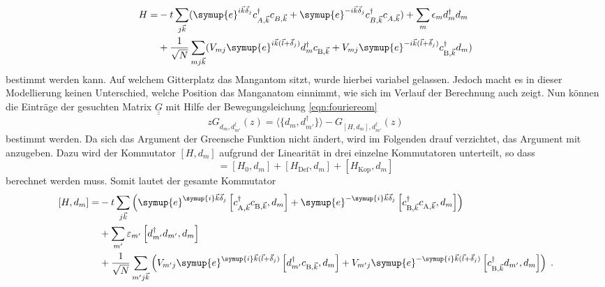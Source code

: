 \begin{equation*}
    \begin{split}
        H = &-t \sum_{j \vec{k}} ( \symup{e}^{i\vec{k}\vec{\delta}_j}c^\dagger_{A,\vec{k}} c_{B,\vec{k}} + 
            \symup{e}^{-i\vec{k}\vec{\delta}_j} c^\dagger_{B,\vec{k}}c_{A,\vec{k}}) + \sum_m \epsilon_m d_m^\dagger d_m \\
            &+ \frac{1}{\sqrt{N}}\sum_{mj\vec{k}} ( V_{mj}  \symup{e}^{i\vec{k}(\vec{l}+\vec{\delta}_j)} d_m^\dagger c_{\text{B},\vec{k}} 
            + V_{mj} \symup{e}^{-i\vec{k}(\vec{l}+\vec{\delta}_j)}c^\dagger_{\text{B},\vec{k}} d_m )
    \end{split}
\end{equation*}
bestimmt werden kann.
Auf welchem Gitterplatz das Mangantom sitzt, wurde hierbei variabel gelassen.
Jedoch macht es in dieser Modellierung keinen Unterschied, welche Position das Manganatom einnimmt, wie sich im Verlauf der Berechnung auch zeigt.
Nun können die Einträge der gesuchten Matrix $\underline{\underline{G}}$ mit Hilfe der Bewegungsleichung \eqref{eqn:fouriereom} 
\begin{equation}
    zG_{d_m, d_{m'}^\dagger}(z) = \langle \{ d_m, d_{m'}^\dagger \} \rangle - G_{[H,d_m], d_{m'}^\dagger} (z) \label{eqn:eomgreenansatz}
\end{equation}
bestimmt werden.
Da sich das Argument der Greensche Funktion nicht ändert, wird im Folgenden drauf verzichtet, das Argument mit anzugeben.
Dazu wird der Kommutator $[H,d_m]$ aufgrund der Linearität in drei einzelne Kommutatoren unterteilt, so dass
\begin{equation*}
    [H,d_m] = [H_0,d_m] + [H_\text{Def},d_m] +[H_\text{Kop},d_m] 
\end{equation*}
berechnet werden muss.
Somit lautet der gesamte Kommutator
\begin{equation}
    \begin{split}
    [H, d_m] = &-t \sum_{j\vec{k}} \left ( \symup{e}^{\symup{i}\vec{k} \vec{\delta}_j}      \left [ c^\dagger_{\text{A},\vec{k}}  
        c_{\text{B},\vec{k}}, d_m \right ] + \symup{e}^{-\symup{i}\vec{k} \vec{\delta}_j}   \left [ c^\dagger_{\text{B},\vec{k}}  
        c_{\text{A},\vec{k}}, d_m \right ]  \right ) \\
        &+\sum_{m'} \varepsilon_{m'} \left [ d^\dagger_{m'} d_{m'}, d_{m} \right ] \\
        &+ \frac{1}{\sqrt{N}} \sum_{m'j\vec{k}} \left ( V_{m'j} \symup{e}^{\symup{i}\vec{k} (\vec{l} + \vec{\delta}_j)}   
        \left [d^\dagger_{m'}c_{\text{B}, \vec{k}}, d_m \right ]
        +  V_{m'j} \symup{e}^{-\symup{i}\vec{k} (\vec{l} + \vec{\delta}_j)}   
        \left [c^\dagger_{\text{B},\vec{k}} d_{m'},  d_m \right ]
        \right ) \; . \label{eqn:commutator_H_dm}
    \end{split}
\end{equation} 
